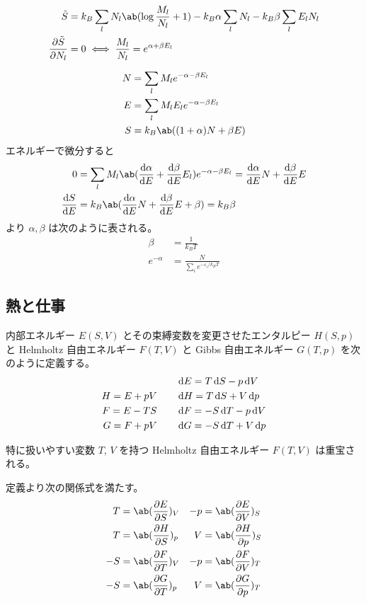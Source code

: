 \documentclass[uplatex,diffipdfmx,a4paper,11pt]{jlreq}
\theoremstyle{definition}
\begin{document}
\begin{align}
  \tilde{S}              & = k_B\sum_{l}N_l\ab(\log\frac{M_l}{N_l} + 1) - k_B\alpha\sum_{l}N_l - k_B\beta\sum_{l}E_lN_l \\
  \diffp{\tilde{S}}{N_l} & = 0 \iff \frac{M_l}{N_l} = e^{\alpha + \beta E_l}
\end{align}

\begin{align}
  N & = \sum_{l}M_le^{-\alpha-\beta E_l}    \\
  E & = \sum_{l}M_lE_le^{-\alpha-\beta E_l} \\
  S & = k_B\ab((1 + \alpha)N + \beta E)
\end{align}
エネルギーで微分すると
\begin{align}
  0           & = \sum_{l}M_l\ab(\diff{\alpha}{E} + \diff{\beta}{E}E_l)e^{-\alpha-\beta E_l} = \diff{\alpha}{E}N + \diff{\beta}{E}E \\
  \diff{S}{E} & = k_B\ab(\diff{\alpha}{E}N + \diff{\beta}{E}E + \beta) = k_B\beta
\end{align}
より $\alpha, \beta$ は次のように表される。
\begin{align}
  \beta       & = \frac{1}{k_BT}                            \\
  e^{-\alpha} & = \frac{N}{\sum_{i}e^{-\varepsilon_i/k_BT}}
\end{align}


\subsection{熱と仕事}
\begin{definition}
  内部エネルギー $E(S, V)$ とその束縛変数を変更させたエンタルピー $H(S, p)$ と Helmholtz 自由エネルギー $F(T, V)$ と Gibbs 自由エネルギー $G(T, p)$ を次のように定義する。
  \begin{align}
               & \qquad \dl{E} = T\dl{S} - p\dl{V}  \\
    H = E + pV & \qquad \dl{H} = T\dl{S} + V\dl{p}  \\
    F = E - TS & \qquad \dl{F} = -S\dl{T} - p\dl{V} \\
    G = F + pV & \qquad \dl{G} = -S\dl{T} + V\dl{p}
  \end{align}
\end{definition}
特に扱いやすい変数 $T$, $V$ を持つ Helmholtz 自由エネルギー $F(T, V)$ は重宝される。
\begin{proposition}
  定義より次の関係式を満たす。
  \begin{align}
    T  & = \ab(\diffp{E}{S})_V & -p & = \ab(\diffp{E}{V})_S \\
    T  & = \ab(\diffp{H}{S})_p & V  & = \ab(\diffp{H}{p})_S \\
    -S & = \ab(\diffp{F}{T})_V & -p & = \ab(\diffp{F}{V})_T \\
    -S & = \ab(\diffp{G}{T})_p & V  & = \ab(\diffp{G}{p})_T
  \end{align}
\end{proposition}
\end{document}
